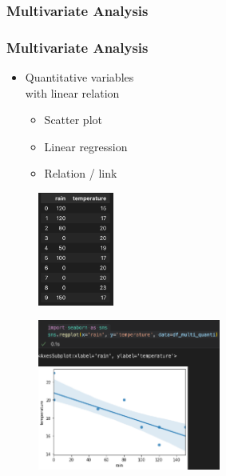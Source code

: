 \subsubsection{Multivariate Analysis}




\begin{frame}\frametitle{Multivariate Analysis}
   \begin{minipage}{0.48\linewidth}
      \begin{itemize}
         \item Quantitative variables\\
               with linear relation
         \begin{itemize}
            \item Scatter plot
            \item Linear regression
            \item Relation / link
         \end{itemize}
      \end{itemize}
      \vspace{.5cm}
      \begin{figure}[H]
         \includegraphics[width=2.5cm]{../images/illustrations/pattern_multivariate_quantitative_df.png}
      \end{figure}
   \end{minipage}
   \begin{minipage}{0.48\linewidth}
      \begin{figure}[H]
         \includegraphics[width=6cm]{../images/illustrations/pattern_multivariate_quantitative_scatter.png}
      \end{figure}
   \end{minipage}
\end{frame}



